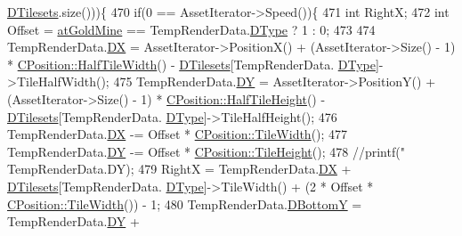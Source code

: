 \begin{DoxyCode}
      \hyperlink{classCAssetRenderer_ae8201de704851c1de6424a8da77b785e}{DTilesets}.size()))\{
470                 \textcolor{keywordflow}{if}(0 == AssetIterator->Speed())\{
471                     \textcolor{keywordtype}{int} RightX;
472                     \textcolor{keywordtype}{int} Offset = \hyperlink{GameDataTypes_8h_a5600d4fc433b83300308921974477feca243d9ba44092eadd561db058d742b3b3}{atGoldMine} == TempRenderData.\hyperlink{structSAssetRenderData_ae986cfe9d4238fa31fb511b40392d97f}{DType} ? 1 : 0;
473                     
474                     TempRenderData.\hyperlink{structSAssetRenderData_ab432edfd1146e38a92576b78e2ad5581}{DX} = AssetIterator->PositionX() + (AssetIterator->Size() - 1) * 
      \hyperlink{classCPosition_a4b799a0fb78ddd8bbd8548980e2458af}{CPosition::HalfTileWidth}() - \hyperlink{classCAssetRenderer_ae8201de704851c1de6424a8da77b785e}{DTilesets}[TempRenderData.
      \hyperlink{structSAssetRenderData_ae986cfe9d4238fa31fb511b40392d97f}{DType}]->TileHalfWidth();
475                     TempRenderData.\hyperlink{structSAssetRenderData_af27e8a46e21a0935983bfc0d34d9ceba}{DY} = AssetIterator->PositionY() + (AssetIterator->Size() - 1) * 
      \hyperlink{classCPosition_a5e371060b1aa0d3d3c5df1e353e0e5fd}{CPosition::HalfTileHeight}() - \hyperlink{classCAssetRenderer_ae8201de704851c1de6424a8da77b785e}{DTilesets}[TempRenderData.
      \hyperlink{structSAssetRenderData_ae986cfe9d4238fa31fb511b40392d97f}{DType}]->TileHalfHeight();
476                     TempRenderData.\hyperlink{structSAssetRenderData_ab432edfd1146e38a92576b78e2ad5581}{DX} -= Offset * \hyperlink{classCPosition_a27a7a8b9a5541da0aa8d97d785650fb8}{CPosition::TileWidth}();
477                     TempRenderData.\hyperlink{structSAssetRenderData_af27e8a46e21a0935983bfc0d34d9ceba}{DY} -= Offset * \hyperlink{classCPosition_ac4f0edd9c9632f1bdca981ef5d9b71e5}{CPosition::TileHeight}();
478                     \textcolor{comment}{//printf("%
       TempRenderData.DY);}
479                     RightX = TempRenderData.\hyperlink{structSAssetRenderData_ab432edfd1146e38a92576b78e2ad5581}{DX} + \hyperlink{classCAssetRenderer_ae8201de704851c1de6424a8da77b785e}{DTilesets}[TempRenderData.
      \hyperlink{structSAssetRenderData_ae986cfe9d4238fa31fb511b40392d97f}{DType}]->TileWidth() + (2 * Offset * \hyperlink{classCPosition_a27a7a8b9a5541da0aa8d97d785650fb8}{CPosition::TileWidth}()) - 1;
480                     TempRenderData.\hyperlink{structSAssetRenderData_a187b7d405b649f0f400a3a8204ef7de2}{DBottomY} = TempRenderData.\hyperlink{structSAssetRenderData_af27e8a46e21a0935983bfc0d34d9ceba}{DY} + 

\end{DoxyCode}
